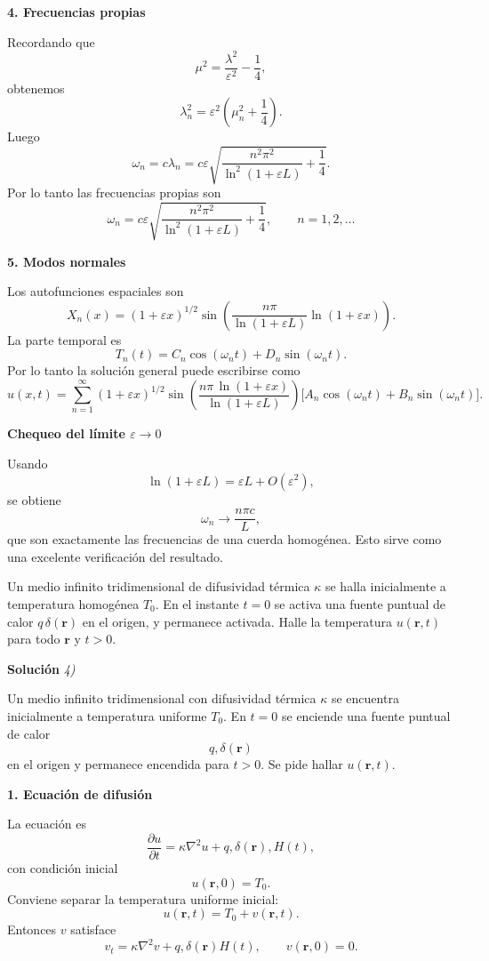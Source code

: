 \documentclass[11pt,spanish]{article}
\newcounter{problema}
\newcommand{\prob}{\stepcounter{problema} \vspace{.5cm} \noindent{\bf Problema \arabic{problema}: }}
\begin{document}
{\bf 4. Frecuencias propias}

Recordando que
$$
\mu^2
=
\frac{\lambda^2}{\varepsilon^2}
-\frac14,
$$
obtenemos
$$
\lambda_n^2
=
\varepsilon^2
\left(
\mu_n^2+\frac14
\right).
$$
Luego
$$
\omega_n
=
c\lambda_n
=
c\varepsilon
\sqrt{
\frac{n^2\pi^2}
{\ln^2(1+\varepsilon L)}
+\frac14
}.
$$
Por lo tanto las frecuencias propias son
$$
\boxed{
\omega_n
=
c\varepsilon
\sqrt{
\frac{n^2\pi^2}
{\ln^2(1+\varepsilon L)}
+\frac14
},
\qquad n=1,2,\ldots
}
$$

{\bf 5. Modos normales}

Los autofunciones espaciales son
$$
\boxed{
X_n(x)
=
(1+\varepsilon x)^{1/2}
\sin\left(
\frac{n\pi}
{\ln(1+\varepsilon L)}
\ln(1+\varepsilon x)
\right).
}
$$
La parte temporal es
$$
T_n(t)
=
C_n\cos(\omega_n t)
+
D_n\sin(\omega_n t).
$$
Por lo tanto la solución general puede escribirse como
$$
\boxed{
u(x,t)
=
\sum_{n=1}^{\infty}
(1+\varepsilon x)^{1/2}
\sin\left(
\frac{n\pi\,\ln(1+\varepsilon x)}
{\ln(1+\varepsilon L)}
\right)
\Big[
A_n\cos(\omega_n t)
+
B_n\sin(\omega_n t)
\Big].
}
$$

{\bf Chequeo del límite $\varepsilon\to0$}

Usando
$$
\ln(1+\varepsilon L)
=
\varepsilon L+O(\varepsilon^2),
$$
se obtiene
$$
\omega_n
\longrightarrow
\frac{n\pi c}{L},
$$
que son exactamente las frecuencias de una cuerda homogénea. Esto sirve como una excelente verificación del resultado.




\prob Un medio infinito tridimensional de difusividad térmica $\kappa$ se halla inicialmente a temperatura homogénea $T_0$. En el instante $t=0$ se activa una fuente puntual de calor $q\,\delta(\mathbf{r})$ en el origen, y permanece activada. Halle la temperatura $u(\mathbf{r},t)$ para todo $\mathbf{r}$ y $t>0$.

\vspace{0.5cm}
{\bf Soluci\'on }{\em 4)}
\vspace{0.5cm}

Un medio infinito tridimensional con difusividad térmica $\kappa$ se encuentra inicialmente a temperatura uniforme $T_0$. En $t=0$ se enciende una fuente puntual de calor
$$
q,\delta(\mathbf r)
$$
en el origen y permanece encendida para $t>0$.
Se pide hallar $u(\mathbf r,t)$.

{\bf 1. Ecuación de difusión}

La ecuación es
$$
\frac{\partial u}{\partial t}
=
\kappa \nabla^2 u
+
q,\delta(\mathbf r),H(t),
$$
con condición inicial
$$
u(\mathbf r,0)=T_0.
$$
Conviene separar la temperatura uniforme inicial:
$$
u(\mathbf r,t)=T_0+v(\mathbf r,t).
$$
Entonces $v$ satisface
$$
v_t=\kappa\nabla^2v+q,\delta(\mathbf r)H(t),
\qquad
v(\mathbf r,0)=0.
$$
\end{document}

